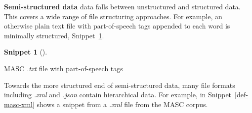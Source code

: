 \documentclass[
  letterpaper,
  krantz1]{latex/krantz-mod}
\newenvironment{Shaded}{\begin{snugshade}}{\end{snugshade}}
\newcommand{\NormalTok}[1]{\textcolor[rgb]{0.00,0.00,0.00}{#1}}
\theoremstyle{definition}
\newtheorem{definition}{Snippet}[chapter]
\theoremstyle{definition}
\theoremstyle{remark}
\begin{document}
\textbf{Semi-structured data} data falls
between unstructured and structured data. This covers a wide range of
file structuring approaches. For example, an otherwise plain text file
with part-of-speech tags appended to each
word is minimally structured, Snippet~\ref{def-masc-pos}.

\begin{definition}[]\protect\hypertarget{def-masc-pos}{}\label{def-masc-pos}

MASC \emph{.txt} file with part-of-speech tags

\begin{Shaded}
\end{Shaded}

\end{definition}

Towards the more structured end of semi-structured data, many file
formats including \emph{.xml} 
and \emph{.json}  contain
hierarchical data. For example, in Snippet~\ref{def-masc-xml} shows a
snippet from a \emph{.xml} file from the MASC corpus.\\
\end{document}
